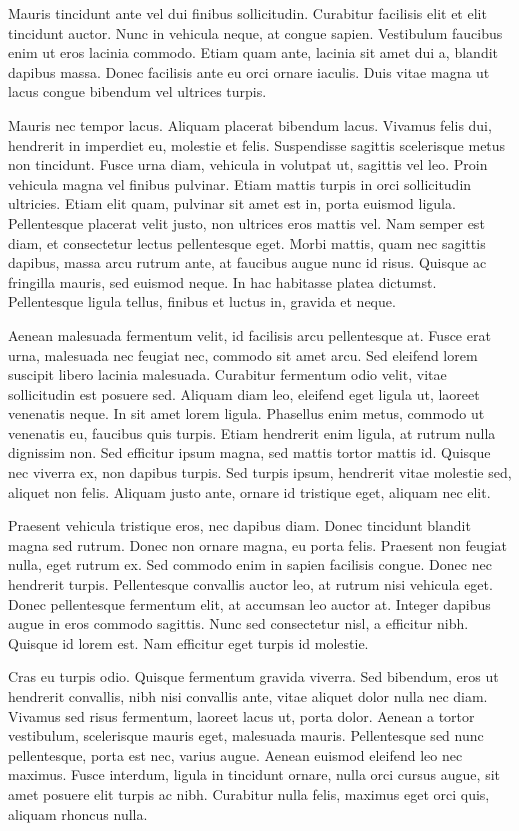 Mauris tincidunt ante vel dui finibus sollicitudin. Curabitur facilisis elit et elit tincidunt auctor. Nunc in vehicula neque, at congue sapien. Vestibulum faucibus enim ut eros lacinia commodo. Etiam quam ante, lacinia sit amet dui a, blandit dapibus massa. Donec facilisis ante eu orci ornare iaculis. Duis vitae magna ut lacus congue bibendum vel ultrices turpis.

Mauris nec tempor lacus. Aliquam placerat bibendum lacus. Vivamus felis dui, hendrerit in imperdiet eu, molestie et felis. Suspendisse sagittis scelerisque metus non tincidunt. Fusce urna diam, vehicula in volutpat ut, sagittis vel leo. Proin vehicula magna vel finibus pulvinar. Etiam mattis turpis in orci sollicitudin ultricies. Etiam elit quam, pulvinar sit amet est in, porta euismod ligula. Pellentesque placerat velit justo, non ultrices eros mattis vel. Nam semper est diam, et consectetur lectus pellentesque eget. Morbi mattis, quam nec sagittis dapibus, massa arcu rutrum ante, at faucibus augue nunc id risus. Quisque ac fringilla mauris, sed euismod neque. In hac habitasse platea dictumst. Pellentesque ligula tellus, finibus et luctus in, gravida et neque.

Aenean malesuada fermentum velit, id facilisis arcu pellentesque at. Fusce erat urna, malesuada nec feugiat nec, commodo sit amet arcu. Sed eleifend lorem suscipit libero lacinia malesuada. Curabitur fermentum odio velit, vitae sollicitudin est posuere sed. Aliquam diam leo, eleifend eget ligula ut, laoreet venenatis neque. In sit amet lorem ligula. Phasellus enim metus, commodo ut venenatis eu, faucibus quis turpis. Etiam hendrerit enim ligula, at rutrum nulla dignissim non. Sed efficitur ipsum magna, sed mattis tortor mattis id. Quisque nec viverra ex, non dapibus turpis. Sed turpis ipsum, hendrerit vitae molestie sed, aliquet non felis. Aliquam justo ante, ornare id tristique eget, aliquam nec elit.

Praesent vehicula tristique eros, nec dapibus diam. Donec tincidunt blandit magna sed rutrum. Donec non ornare magna, eu porta felis. Praesent non feugiat nulla, eget rutrum ex. Sed commodo enim in sapien facilisis congue. Donec nec hendrerit turpis. Pellentesque convallis auctor leo, at rutrum nisi vehicula eget. Donec pellentesque fermentum elit, at accumsan leo auctor at. Integer dapibus augue in eros commodo sagittis. Nunc sed consectetur nisl, a efficitur nibh. Quisque id lorem est. Nam efficitur eget turpis id molestie.

Cras eu turpis odio. Quisque fermentum gravida viverra. Sed bibendum, eros ut hendrerit convallis, nibh nisi convallis ante, vitae aliquet dolor nulla nec diam. Vivamus sed risus fermentum, laoreet lacus ut, porta dolor. Aenean a tortor vestibulum, scelerisque mauris eget, malesuada mauris. Pellentesque sed nunc pellentesque, porta est nec, varius augue. Aenean euismod eleifend leo nec maximus. Fusce interdum, ligula in tincidunt ornare, nulla orci cursus augue, sit amet posuere elit turpis ac nibh. Curabitur nulla felis, maximus eget orci quis, aliquam rhoncus nulla.

